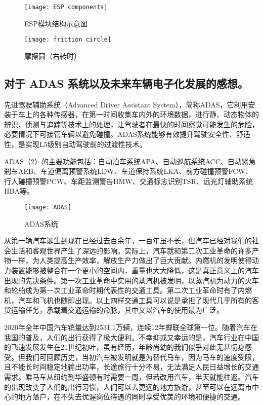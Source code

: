 \documentclass[UTF8]{ctexart}
\numberwithin{figure}{section}
\numberwithin{table}{section}
\begin{document}
\begin{figure}[htbp]
	\centering
	\begin{minipage}[b]{0.59\textwidth}
		\centering
		\texttt{[image: ESP components]}
		\caption{ESP模块结构示意图}
		\label{ESP components}
	\end{minipage}
	\begin{minipage}[b]{0.4\textwidth}
		\centering
		\texttt{[image: friction circle]}
		\caption{摩擦圆（右转时）}
		\label{friction circle}
	\end{minipage}
\end{figure}

\subsection{对于 ADAS 系统以及未来车辆电子化发展的感想。}

先进驾驶辅助系统（Advanced Driver Assistant System），简称ADAS，它利用安装于车上的各种传感器，在第一时间收集车内外的环境数据，进行静、动态物体的辨识、侦测与追踪等技术上的处理，让驾驶者在最快的时间察觉可能发生的危险，必要情况下可接管车辆以避免碰撞。ADAS系统能够有效提升驾驶安全性、舒适性，是实现L5级别自动驾驶前的过渡性技术。

ADAS（\cref{ADAS}）的主要功能包括：自动泊车系统APA、自动巡航系统ACC、自动紧急刹车AEB、车道偏离预警系统LDW、车道保持系统LKA、前方碰撞预警FCW、行人碰撞预警PCW、车距监测警告HMW、交通标志识别TSR、远光灯辅助系统HBA等。

\begin{figure}[htbp]
	\centering
	\begin{minipage}[b]{\textwidth}
		\centering
		\texttt{[image: ADAS]}
		\caption{ADAS系统}
		\label{ADAS}
	\end{minipage}
\end{figure}

从第一辆汽车诞生到现在已经过去百余年，一百年虽不长，但汽车已经对我们的社会生活和客观世界产生了深远的影响。实际上，汽车就和第二次工业革命的许多产物一样，为人类提高生产效率，解放生产力做出了巨大贡献。内燃机的发明使得动力装置能够被整合在一个更小的空间内，重量也大大降低，这是真正意义上的汽车出现的先决条件。第一次工业革命中实用的蒸汽机被发明，以蒸汽机为动力的火车和轮船成为第一次工业革命时期代表性的交通工具。第二次工业革命时有了内燃机，汽车和飞机也随即出现。以上四样交通工具可以说是承担了现代几乎所有的客货运输任务，承载着交通运输的命脉，其中又以汽车的使用最为广泛。

2020年全年中国汽车销量达到2531.1万辆，连续12年蝉联全球第一位。随着汽车在我国的普及，人们的出行获得了极大便利。不幸抑或又幸运的是，汽车行业在中国的飞速发展发生在21世纪初叶，虽有经历，年龄尚幼的我们似乎对此无甚切身感受。但我们可回顾历史，当初汽车被发明就是为替代马车，因为马车的速度受限，且不能长时间稳定地输出功率，长途旅行十分不易，无法满足人民日益增长的交通需求。乘马车从纽约到华盛顿有时需要一周，但若改用汽车，半天就能往返。汽车的出现改变了人们的出行习惯，人们可以去更远的地方旅游，甚至可以在远离市中心的地方落户，在不失去优渥岗位待遇的同时享受优美的环境和便捷的交通。
\end{document}
